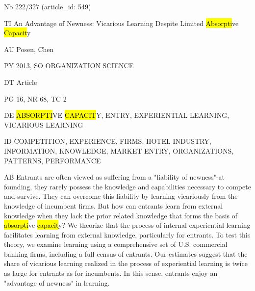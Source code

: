 \documentclass[a4paper]{article}
\begin{document}
\vspace*{-2cm}
Nb \tabto{0cm}222/327 (article\_id: 549)\par
TI \tabto{0cm}An Advantage of Newness: Vicarious Learning Despite Limited \hl{Absorpti}ve \hl{Capacit}y\par
AU \tabto{0cm}Posen, Chen\par
PY \tabto{0cm}2013, SO ORGANIZATION SCIENCE\par
DT \tabto{0cm}Article\par
PG \tabto{0cm}16, NR 68, TC 2\par
DE \tabto{0cm}\hl{ABSORPTI}VE \hl{CAPACIT}Y, ENTRY, EXPERIENTIAL LEARNING, VICARIOUS LEARNING\par
ID \tabto{0cm}COMPETITION, EXPERIENCE, FIRMS, HOTEL INDUSTRY, INFORMATION, KNOWLEDGE, MARKET ENTRY, ORGANIZATIONS, PATTERNS, PERFORMANCE\par
AB \tabto{0cm}Entrants are often viewed as suffering from a "liability of newness"-at founding, they rarely possess the knowledge and capabilities necessary to compete and survive. They can overcome this liability by learning vicariously from the knowledge of incumbent firms. But how can entrants learn from external knowledge when they lack the prior related knowledge that forms the basis of \hl{absorpti}ve \hl{capacit}y? We theorize that the process of internal experiential learning facilitates learning from external knowledge, particularly for entrants. To test this theory, we examine learning using a comprehensive set of U.S. commercial banking firms, including a full census of entrants. Our estimates suggest that the share of vicarious learning realized in the process of experiential learning is twice as large for entrants as for incumbents. In this sense, entrants enjoy an "advantage of newness" in learning.\par
\clearpage
\end{document}
